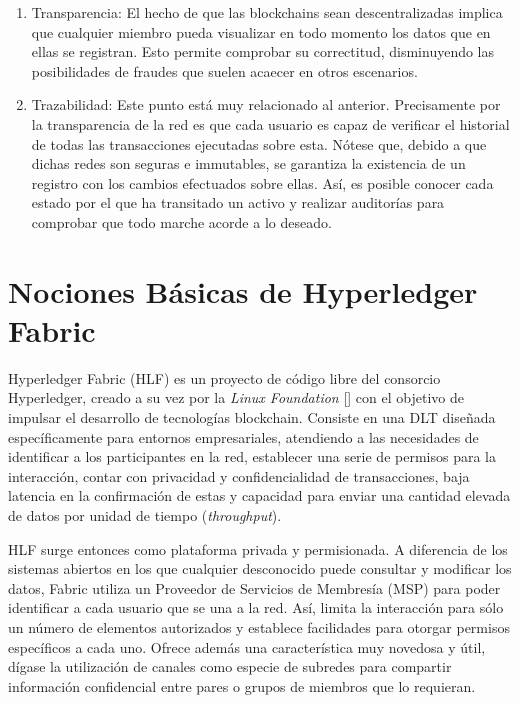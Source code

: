 \begin{enumerate}
	
	\item Transparencia: El hecho de que las blockchains sean descentralizadas implica que cualquier miembro pueda visualizar en todo momento los datos que en ellas se registran. Esto permite comprobar su correctitud, disminuyendo las posibilidades de fraudes que suelen acaecer en otros escenarios.
	
	\item Trazabilidad: Este punto est\'a muy relacionado al anterior. Precisamente por la transparencia de la red es que cada usuario es capaz de verificar el historial de todas las transacciones ejecutadas sobre esta. N\'otese que, debido a que dichas redes son seguras e immutables, se garantiza la existencia de un registro con los cambios efectuados sobre ellas. As\'i, es posible conocer cada estado por el que ha transitado un activo y realizar auditor\'ias para comprobar que todo marche acorde a lo deseado.	

\end{enumerate}


\section{Nociones B\'asicas de Hyperledger Fabric}

Hyperledger Fabric (HLF) es un proyecto de c\'odigo libre del consorcio Hyperledger, creado a su vez por la \emph{Linux Foundation} [\cite{linuxfoundation}] con el objetivo de impulsar el desarrollo de tecnolog\'ias blockchain. Consiste en una DLT dise\~nada espec\'ificamente para entornos empresariales, atendiendo a las necesidades de identificar a los participantes en la red, establecer una serie de permisos para la interacci\'on, contar con privacidad y confidencialidad de transacciones, baja latencia en la confirmaci\'on de estas y capacidad para enviar una cantidad elevada de datos por unidad de tiempo (\emph{throughput}).

HLF surge entonces como plataforma privada y permisionada. A diferencia de los sistemas abiertos en los que cualquier desconocido puede consultar y modificar los datos, Fabric utiliza un Proveedor de Servicios de Membres\'ia (MSP) para poder identificar a cada usuario que se una a la red. As\'i, limita la interacci\'on para s\'olo un n\'umero de elementos autorizados y establece facilidades para otorgar permisos espec\'ificos a cada uno. Ofrece adem\'as una caracter\'istica muy novedosa y \'util, d\'igase la utilizaci\'on de canales como especie de subredes para compartir informaci\'on confidencial entre pares o grupos de miembros que lo requieran.


